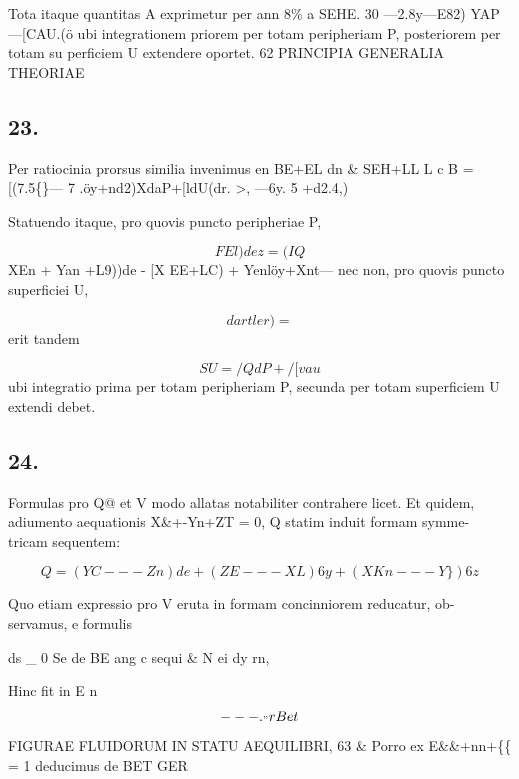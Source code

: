 \documentclass[12pt,a4paper]{article}
\begin{document}
Tota itaque quantitas A exprimetur per
ann    8\%          a
SEHE. 30 ---2.8y---E82) YAP---[CAU.(ö
ubi integrationem priorem per totam peripheriam          P, posteriorem per totam su
perficiem U extendere oportet.
62                                   PRINCIPIA   GENERALIA           THEORIAE



\subsection*{23.}

Per ratiocinia prorsus similia invenimus
en       BE+EL        dn
\&          SEH+LL                                                    L         c
B =      [(7.5\textdegree\{\}---       7       .öy+nd2)XdaP+[ldU(dr. >, ---6y.                             5      +d2.4,)

Statuendo itaque, pro quovis puncto peripheriae P,

\[                                              FEl)dez = (IQ\]
XEn + Yan +L9))de - [X EE+LC) + Yenlöy+Xnt---
nec non, pro quovis puncto superficiei                 U,


\[             dar                                                           tler) =\]
erit tandem

\[                                       SU=/QdP+/[vau\]
ubi integratio prima per totam peripheriam P, secunda per totam superficiem                                U
extendi debet.


\subsection*{24.}

Formulas pro Q@ et V modo allatas notabiliter contrahere licet. Et quidem,
adiumento aequationis X\&+-Yn+ZT = 0, Q statim induit formam symme-
tricam sequentem:

\[                   Q = (YC--- Zn)de + (ZE---XL)6y+(XKn---Y\})6z\]

Quo etiam expressio pro V eruta in formam concinniorem reducatur, ob-
servamus,      e formulis

ds \_ 0                    Se
de          BE                 ang    c
sequi
\&              N
ei
dy    rn,

Hinc fit
in                          E                        n
\[                             ---._                       "r                  Bet\]
FIGURAE    FLUIDORUM      IN STATU     AEQUILIBRI,                     63
\&
Porro ex     E\&\&+nn+\{\{ =         1 deducimus
de        BET              GER
\end{document}
